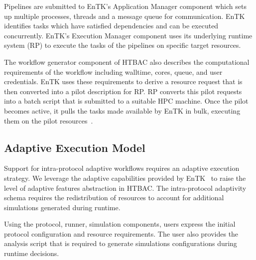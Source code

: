 Pipelines are submitted to EnTK's
Application Manager component which sets up multiple processes, threads and a
message queue for communication. EnTK identifies tasks which have satisfied
dependencies and can be executed concurrently. EnTK's Execution Manager
component uses its underlying runtime system (RP) to execute the tasks of the
pipelines on specific target resources.


The workflow generator component of HTBAC also describes the computational 
requirements of the workflow including walltime, cores, queue, and user 
credentials. EnTK uses these requirements to derive a resource request that is 
then converted into a pilot description for RP. RP converts this pilot requests 
into a batch script that is submitted to a suitable HPC machine. Once the pilot 
becomes active, it pulls the tasks made available by EnTK in bulk, executing 
them on the pilot resources~\cite{merzky2015radical}.

\subsection{Adaptive Execution Model}

Support for intra-protocol adaptive workflows requires an adaptive execution 
strategy. We leverage the adaptive capabilities provided by 
EnTK~\cite{adaptivebiomolecular} to raise the level of adaptive features 
abstraction in HTBAC. The intra-protocol adaptivity schema requires the 
redistribution of resources to account for additional simulations generated 
during runtime. 


Using the protocol, runner, simulation components, users express the initial 
protocol configuration and resource requirements. The user also provides the 
analysis script that is required to generate simulations configurations during 
runtime decisions. 

